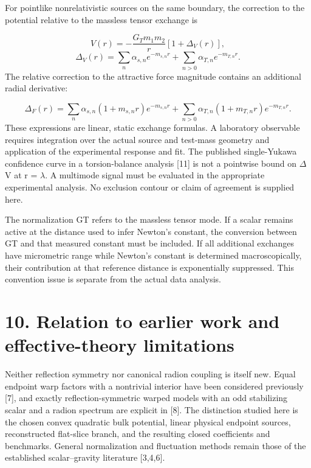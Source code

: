 \documentclass[11pt]{article}
\begin{document}
For pointlike nonrelativistic sources on the same boundary, the correction to the potential relative to the massless tensor exchange is

\begin{equation}
V(r)=-\frac{G_Tm_1m_2}{r}\left[1+\Delta_V(r)\right],\tag{33}
\end{equation}
\begin{equation}
\Delta_V(r)=\sum_n\alpha_{s,n}e^{-m_{s,n}r}+\sum_{n>0}\alpha_{T,n}e^{-m_{T,n}r}.\tag{34}
\end{equation}
The relative correction to the attractive force magnitude contains an additional radial derivative:

\begin{equation}
\Delta_F(r)=\sum_n\alpha_{s,n}(1+m_{s,n}r)e^{-m_{s,n}r}+\sum_{n>0}\alpha_{T,n}(1+m_{T,n}r)e^{-m_{T,n}r}.\tag{35}
\end{equation}
These expressions are linear, static exchange formulas. A laboratory observable requires integration over the actual source and test-mass geometry and application of the experimental response and fit. The published single-Yukawa confidence curve in a torsion-balance analysis [11] is not a pointwise bound on \(\Delta\)V at r = \(\lambda\). A multimode signal must be evaluated in the appropriate experimental analysis. No exclusion contour or claim of agreement is supplied here.

The normalization GT refers to the massless tensor mode. If a scalar remains active at the distance used to infer Newton's constant, the conversion between GT and that measured constant must be included. If all additional exchanges have micrometric range while Newton's constant is determined macroscopically, their contribution at that reference distance is exponentially suppressed. This convention issue is separate from the actual data analysis.

\section*{10. Relation to earlier work and effective-theory limitations}
Neither reflection symmetry nor canonical radion coupling is itself new. Equal endpoint warp factors with a nontrivial interior have been considered previously [7], and exactly reflection-symmetric warped models with an odd stabilizing scalar and a radion spectrum are explicit in [8]. The distinction studied here is the chosen convex quadratic bulk potential, linear physical endpoint sources, reconstructed flat-slice branch, and the resulting closed coefficients and benchmarks. General normalization and fluctuation methods remain those of the established scalar--gravity literature [3,4,6].
\end{document}
